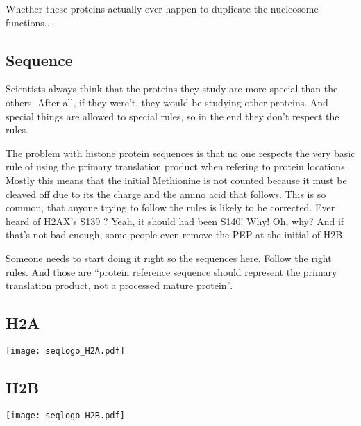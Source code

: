     Whether these proteins actually ever happen to duplicate the nucleosome functions...

  \subsection{Sequence}
    Scientists always think that the proteins they study are more special than
    the others. After all, if they were't, they would be studying other proteins.
    And special things are allowed to special rules, so in the end they don't
    respect the rules.

    The problem with histone protein sequences is that no one respects the very
    basic rule of using the primary translation product when refering to protein
    locations. Mostly this means that the initial Methionine is not counted because
    it must be cleaved off due to its the charge and the amino acid that follows.
    This is so common, that anyone trying to follow the rules is likely to be corrected.
    Ever heard of H2AX's S139 ? Yeah, it should had been S140! Why! Oh, why?
    And if that's not bad enough, some people even remove the PEP at the initial
    of H2B.

    Someone needs to start doing it right so the sequences here. Follow the right
    rules. And those are ``protein reference sequence should represent the primary
    translation product, not a processed mature protein''\citep{desc-seq-variant}.

  \subsection{H2A}
    \begin{TableAndFigure*}
      \label{tab:H2A-consensus}
      

      \texttt{[image: seqlogo\_H2A.pdf]}
      \label{fig:H2A-weblogo}
    \end{TableAndFigure*}


  \subsection{H2B}
    \begin{TableAndFigure*}
      \label{tab:H2B-consensus}
      

      \texttt{[image: seqlogo\_H2B.pdf]}
      \label{fig:H2B-weblogo}
    \end{TableAndFigure*}

